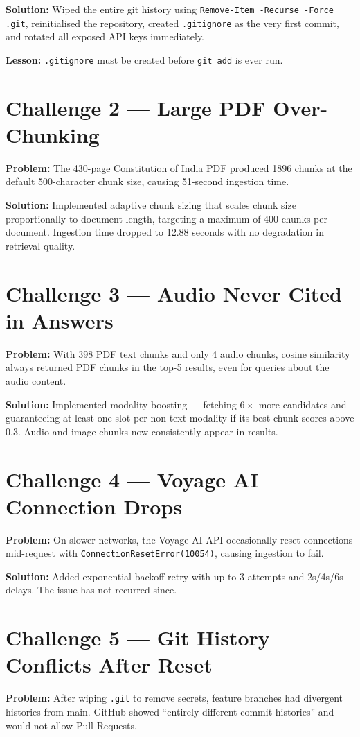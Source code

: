 \documentclass[12pt,a4paper]{report}
\begin{document}
\textbf{Solution:} Wiped the entire git history using \texttt{Remove-Item -Recurse -Force .git}, reinitialised the repository, created \texttt{.gitignore} as the very first commit, and rotated all exposed API keys immediately.

\textbf{Lesson:} \texttt{.gitignore} must be created before \texttt{git add} is ever run.

\section{Challenge 2 --- Large PDF Over-Chunking}
\textbf{Problem:} The 430-page Constitution of India PDF produced 1896 chunks at the default 500-character chunk size, causing 51-second ingestion time.

\textbf{Solution:} Implemented adaptive chunk sizing that scales chunk size proportionally to document length, targeting a maximum of 400 chunks per document. Ingestion time dropped to 12.88 seconds with no degradation in retrieval quality.

\section{Challenge 3 --- Audio Never Cited in Answers}
\textbf{Problem:} With 398 PDF text chunks and only 4 audio chunks, cosine similarity always returned PDF chunks in the top-5 results, even for queries about the audio content.

\textbf{Solution:} Implemented modality boosting --- fetching $6\times$ more candidates and guaranteeing at least one slot per non-text modality if its best chunk scores above 0.3. Audio and image chunks now consistently appear in results.

\section{Challenge 4 --- Voyage AI Connection Drops}
\textbf{Problem:} On slower networks, the Voyage AI API occasionally reset connections mid-request with \texttt{ConnectionResetError(10054)}, causing ingestion to fail.

\textbf{Solution:} Added exponential backoff retry with up to 3 attempts and 2s/4s/6s delays. The issue has not recurred since.

\section{Challenge 5 --- Git History Conflicts After Reset}
\textbf{Problem:} After wiping \texttt{.git} to remove secrets, feature branches had divergent histories from main. GitHub showed ``entirely different commit histories'' and would not allow Pull Requests.
\end{document}
